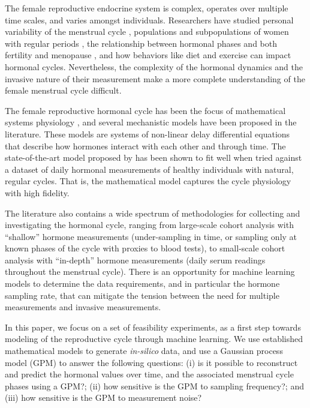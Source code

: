 \documentclass{article}
\begin{document}
The female reproductive endocrine system is complex, operates over multiple
time scales, and varies amongst individuals. Researchers have studied personal
variability of the menstrual cycle \citep{j-Lenton1984,j-Alliende2002},
populations and subpopulations of  women with regular periods
\citep{j-Landgren1980,j-Bonen1981,j-Ecochard2017}, the relationship between
hormonal phases and both fertility \citep{j-Jordan1994, j-Crawford2017} and menopause
\citep{j-Prior1998,j-Landgren2004,j-Prior2011}, and how behaviors like diet
\citep{j-Barr1995} and exercise \citep{j-Prior1987} can impact hormonal cycles.
Nevertheless, the complexity of the hormonal dynamics and the invasive nature
of their measurement make a more complete understanding of the female menstrual
cycle difficult. 

The female reproductive hormonal cycle has been the focus of mathematical systems physiology \cite{b-Keener2009}, and several mechanistic models have been proposed in the literature. These models are systems of non-linear delay differential equations that describe how hormones interact with each other and through time. The state-of-the-art model proposed by \citet{j-Clark2003} has been shown to fit well when tried against a dataset of daily hormonal measurements of healthy individuals with natural, regular cycles. That is, the mathematical model captures the cycle physiology with high fidelity.

The literature also contains a wide spectrum of methodologies for collecting and investigating the hormonal cycle, ranging from large-scale cohort analysis with ``shallow'' hormone measurements (under-sampling in time, or sampling only at known phases of the cycle with proxies to blood tests), to small-scale cohort analysis with ``in-depth'' hormone measurements (daily serum readings throughout the menstrual cycle). There is an opportunity for machine learning models to determine the data requirements, and in particular the hormone sampling rate, that can mitigate the tension between the need for multiple measurements and invasive measurements. 

In this paper, we focus on a set of feasibility experiments, as a first step towards modeling of the reproductive cycle through machine learning. We use established mathematical models to generate \emph{in-silico} data, and use a Gaussian process model (GPM) \cite{b-Rasmussen2006} to answer the following questions: (i) is it possible to reconstruct and
predict the hormonal values over time, and the associated menstrual cycle phases using a GPM?; (ii) how sensitive is the  GPM to sampling frequency?; and (iii) how sensitive is the GPM to measurement noise?
\end{document}
